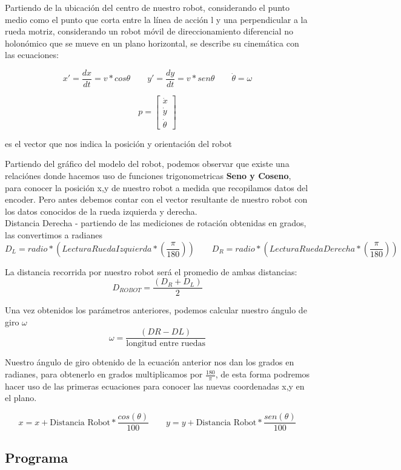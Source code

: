 \documentclass[oneside,onecolumn]{article}
\begin{document}
Partiendo de la ubicación del centro de nuestro robot, considerando el punto medio como el punto que corta entre la línea de acción l y una perpendicular a la rueda motriz, considerando un robot móvil de direccionamiento diferencial no holonómico que se mueve en un plano horizontal, se describe su cinemática con las ecuaciones:

\[ x' = \frac{dx}{dt} = v*cos \theta \qquad y' = \frac{dy}{dt} = v*sen \theta \qquad \dot{\theta} = \omega \]

\[ p = \begin{bmatrix}
  \dot{x}\\
  \dot{y}\\
  \dot{\theta}
\end{bmatrix}\]

es el vector que nos indica la posición y orientación del robot

Partiendo del gráfico del modelo del robot, podemos observar que existe una relaciónes donde hacemos uso de funciones trigonometricas \textbf{Seno y Coseno}, para conocer la posición x,y de nuestro robot a medida que recopilamos datos del encoder. Pero antes debemos contar con el vector resultante de nuestro robot con los datos conocidos de la rueda izquierda y derecha.\\

Distancia Derecha - partiendo de las mediciones de rotación obtenidas en grados, las convertimos a radianes\\
\[ D_{L} = radio * (Lectura Rueda Izquierda * (\frac{\pi}{180})) \qquad D_{R} = radio * (Lectura Rueda Derecha * (\frac{\pi}{180})) \]

La distancia recorrida por nuestro robot será el promedio de ambas distancias:
\[D_{ROBOT} = \frac{(D_{R}+D_{L})}{2}\]

Una vez obtenidos los parámetros anteriores, podemos calcular nuestro ángulo de giro $\omega$
\[\omega = \frac{(DR-DL)}{\mbox{longitud entre ruedas}} \]

Nuestro ángulo de giro obtenido de la ecuación anterior nos dan los grados en radianes, para obtenerlo en grados multiplicamos por $\frac{180}{\pi}$, de esta forma podremos hacer uso de las primeras ecuaciones para conocer las nuevas coordenadas x,y en el plano.

\[ x = x + \mbox{Distancia Robot} * \frac{cos(\theta)}{100} \qquad y = y + \mbox{Distancia Robot} * \frac{sen(\theta)}{100} \]

\subsection{Programa}
\end{document}
